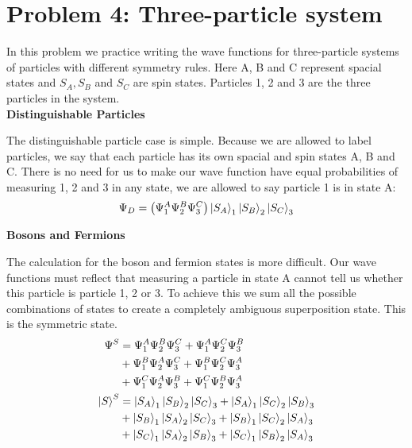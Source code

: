\documentclass[10pt]{article} %
\begin{document}
\section{Problem 4: Three-particle system}
In this problem we practice writing the wave functions for three-particle systems of particles
with different symmetry rules. Here A, B and C represent spacial states and $S_A, S_B$ and $S_C$ are
spin states. Particles 1, 2 and 3 are the three particles in the system.\\

\textbf{Distinguishable Particles}

The distinguishable particle case is simple. Because we are allowed to label particles, we say that
each particle has its own spacial and spin states A, B and C. There is no need for us to make our
wave function have equal probabilities of measuring 1, 2 and 3 in any state, we are allowed to say
particle 1 is in state A:\\

\begin{align*}
  \Psi_D &= \left(\Psi_1^A\Psi_2^B\Psi_3^C\right)\ket{S_A}_1\ket{S_B}_2\ket{S_C}_3\\
\end{align*}

\textbf{Bosons and Fermions}

The calculation for the boson and fermion states is more difficult. Our wave functions must reflect
that measuring a particle in state A cannot tell us whether this particle is particle 1, 2 or 3. To
achieve this we sum all the possible combinations of states to create a completely ambiguous
superposition state. This is the symmetric state.\\

\begin{align*}
  \Psi^{S} &=
  \Psi_1^A\Psi_2^B\Psi_3^C + \Psi_1^A\Psi_2^C\Psi_3^B\\
  &+ \Psi_1^B\Psi_2^A\Psi_3^C + \Psi_1^B\Psi_2^C\Psi_3^A\\
  &+ \Psi_1^C\Psi_2^A\Psi_3^B + \Psi_1^C\Psi_2^B\Psi_3^A\\
  \ket{S}^{S} &=
  \ket{S_A}_1\ket{S_B}_2\ket{S_C}_3 + \ket{S_A}_1\ket{S_C}_2\ket{S_B}_3\\
  &+ \ket{S_B}_1\ket{S_A}_2\ket{S_C}_3 + \ket{S_B}_1\ket{S_C}_2\ket{S_A}_3\\
  &+ \ket{S_C}_1\ket{S_A}_2\ket{S_B}_3 + \ket{S_C}_1\ket{S_B}_2\ket{S_A}_3\\
\end{align*}
\end{document}
